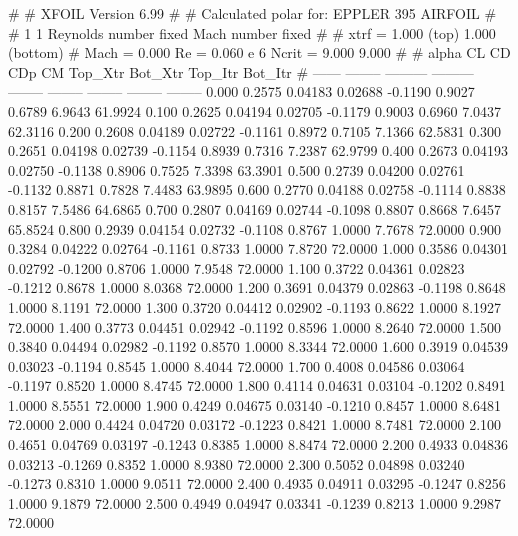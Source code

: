 #  
#       XFOIL         Version 6.99
#  
# Calculated polar for: EPPLER 395 AIRFOIL                              
#  
# 1 1 Reynolds number fixed          Mach number fixed         
#  
# xtrf =   1.000 (top)        1.000 (bottom)  
# Mach =   0.000     Re =     0.060 e 6     Ncrit =   9.000  9.000
#  
#   alpha    CL        CD       CDp       CM     Top_Xtr  Bot_Xtr  Top_Itr  Bot_Itr
#  ------ -------- --------- --------- -------- -------- -------- -------- --------
   0.000   0.2575   0.04183   0.02688  -0.1190   0.9027   0.6789   6.9643  61.9924
   0.100   0.2625   0.04194   0.02705  -0.1179   0.9003   0.6960   7.0437  62.3116
   0.200   0.2608   0.04189   0.02722  -0.1161   0.8972   0.7105   7.1366  62.5831
   0.300   0.2651   0.04198   0.02739  -0.1154   0.8939   0.7316   7.2387  62.9799
   0.400   0.2673   0.04193   0.02750  -0.1138   0.8906   0.7525   7.3398  63.3901
   0.500   0.2739   0.04200   0.02761  -0.1132   0.8871   0.7828   7.4483  63.9895
   0.600   0.2770   0.04188   0.02758  -0.1114   0.8838   0.8157   7.5486  64.6865
   0.700   0.2807   0.04169   0.02744  -0.1098   0.8807   0.8668   7.6457  65.8524
   0.800   0.2939   0.04154   0.02732  -0.1108   0.8767   1.0000   7.7678  72.0000
   0.900   0.3284   0.04222   0.02764  -0.1161   0.8733   1.0000   7.8720  72.0000
   1.000   0.3586   0.04301   0.02792  -0.1200   0.8706   1.0000   7.9548  72.0000
   1.100   0.3722   0.04361   0.02823  -0.1212   0.8678   1.0000   8.0368  72.0000
   1.200   0.3691   0.04379   0.02863  -0.1198   0.8648   1.0000   8.1191  72.0000
   1.300   0.3720   0.04412   0.02902  -0.1193   0.8622   1.0000   8.1927  72.0000
   1.400   0.3773   0.04451   0.02942  -0.1192   0.8596   1.0000   8.2640  72.0000
   1.500   0.3840   0.04494   0.02982  -0.1192   0.8570   1.0000   8.3344  72.0000
   1.600   0.3919   0.04539   0.03023  -0.1194   0.8545   1.0000   8.4044  72.0000
   1.700   0.4008   0.04586   0.03064  -0.1197   0.8520   1.0000   8.4745  72.0000
   1.800   0.4114   0.04631   0.03104  -0.1202   0.8491   1.0000   8.5551  72.0000
   1.900   0.4249   0.04675   0.03140  -0.1210   0.8457   1.0000   8.6481  72.0000
   2.000   0.4424   0.04720   0.03172  -0.1223   0.8421   1.0000   8.7481  72.0000
   2.100   0.4651   0.04769   0.03197  -0.1243   0.8385   1.0000   8.8474  72.0000
   2.200   0.4933   0.04836   0.03213  -0.1269   0.8352   1.0000   8.9380  72.0000
   2.300   0.5052   0.04898   0.03240  -0.1273   0.8310   1.0000   9.0511  72.0000
   2.400   0.4935   0.04911   0.03295  -0.1247   0.8256   1.0000   9.1879  72.0000
   2.500   0.4949   0.04947   0.03341  -0.1239   0.8213   1.0000   9.2987  72.0000
